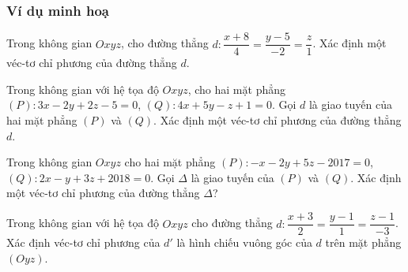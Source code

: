 	\subsubsection{Ví dụ minh hoạ}
	\begin{vd}%
	Trong không gian $Oxyz$, cho đường thẳng $d:\dfrac{x+8}{4}=\dfrac{y-5}{-2}=\dfrac{z}{1}$. Xác định một véc-tơ chỉ phương của đường thẳng $d$.
	\end{vd}
	\begin{vd}%
	Trong không gian với hệ tọa độ $Oxyz$, cho hai mặt phẳng $(P): 3x-2y+2z-5=0$, $(Q): 4x+5y-z+1=0$. Gọi $ d $ là giao tuyến của hai mặt phẳng $(P)$ và $(Q)$. Xác định một véc-tơ chỉ phương của đường thẳng $d$.
	\end{vd}
	\begin{vd}%
	Trong không gian $Oxyz$ cho hai mặt phẳng $(P)\colon -x-2y+5z-2017=0$, $(Q)\colon 2x-y+3z+2018=0$. Gọi $\Delta$ là giao tuyến của $(P)$ và $(Q)$. Xác định một véc-tơ chỉ phương của đường thẳng $\Delta$?
	\end{vd}
	\begin{vd}%
	Trong không gian với hệ tọa độ $Oxyz$ cho đường thẳng $d \colon \dfrac{x+3}{2} = \dfrac{y-1}{1}=\dfrac{z-1}{-3}$. Xác định véc-tơ chỉ phương của $ d' $ là hình chiếu vuông góc của $d$ trên mặt phẳng $(Oyz)$.
	\end{vd}
